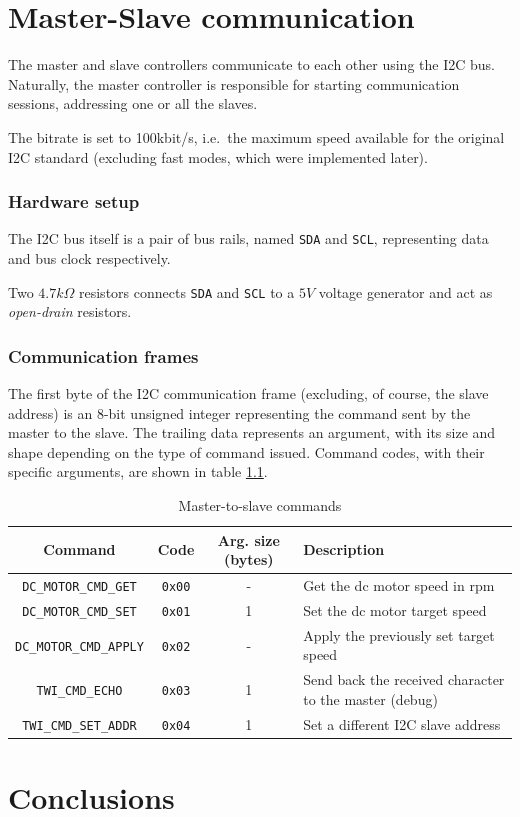 \documentclass[binding=0.6cm,Lau]{sapthesis}
\begin{document}
\chapter{Master-Slave communication}
\label{ch:master-slave-comm}
The master and slave controllers communicate to each other using the I2C
bus. Naturally, the master controller is responsible for starting communication
sessions, addressing one or all the slaves.

The bitrate is set to 100kbit/s, i.e.\ the maximum speed available for the
original I2C standard\cite{i2c-ref} (excluding fast modes, which were
implemented later).

\subsection{Hardware setup}
The I2C bus itself is a pair of bus rails, named \texttt{SDA} and \texttt{SCL},
representing data and bus clock respectively.

Two $4.7 k\Omega$ resistors connects \texttt{SDA} and \texttt{SCL} to a $5V$
voltage generator and act as \emph{open-drain} resistors.

\subsection{Communication frames}
The first byte of the I2C communication frame (excluding, of course, the slave
address) is an 8-bit unsigned integer representing the command sent by the
master to the slave. The trailing data represents an argument, with its size
and shape depending on the type of command issued. Command codes, with their
specific arguments, are shown in table \ref{tab:i2c-commands}.

\begin{table}[bh]
  \begin{tabularx}{\textwidth}{c c c X}
    \toprule
    Command & Code & Arg. size (bytes) & Description \\
    \midrule
      \texttt{DC\_MOTOR\_CMD\_GET}   & \texttt{0x00} & - & Get the dc motor speed in rpm \\
      \texttt{DC\_MOTOR\_CMD\_SET}   & \texttt{0x01} & 1 & Set the dc motor target speed \\
      \texttt{DC\_MOTOR\_CMD\_APPLY} & \texttt{0x02} & - & Apply the previously set target speed \\
      \texttt{TWI\_CMD\_ECHO}        & \texttt{0x03} & 1 & Send back the received character to the master (debug)\\
      \texttt{TWI\_CMD\_SET\_ADDR}   & \texttt{0x04} & 1 & Set a different I2C slave address \\
    \bottomrule
  \end{tabularx}
  \caption{Master-to-slave commands}
  \label{tab:i2c-commands}
\end{table}


\chapter{Conclusions}
\label{ch:conclusions}


\backmatter
\cleardoublepage
{} %



\end{document}
